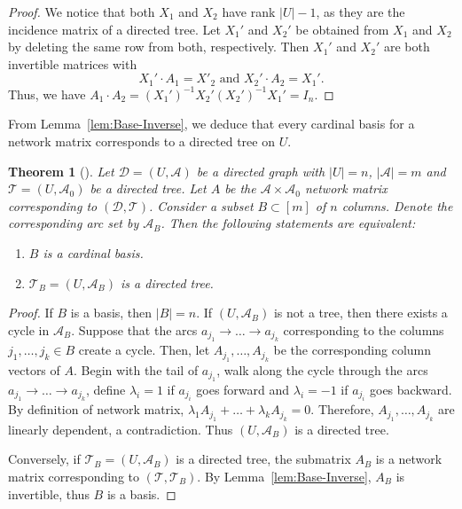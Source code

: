 \documentclass[11pt]{article}
\newtheorem{theorem}{Theorem}
\begin{document}
\begin{proof}
\smallskip

We notice that both $X_1$ and $X_2$ have rank $|U|-1$, as they are the incidence matrix of a directed tree. Let $X_1'$ and $X_2'$ be obtained from $X_1$ and $X_2$ by deleting the same row from both, respectively. Then $X_1'$ and $X_2'$ are both invertible matrices with
$$X_1'\cdot A_1=X'_2\textrm{ and }X_2'\cdot A_2=X_1'.$$
Thus, we have $A_1\cdot A_2=(X_1')^{-1} X_2'(X_2')^{-1}X_1'=I_n$.
\end{proof}



From Lemma~\ref{lem:Base-Inverse}, we deduce that every cardinal basis for a network matrix corresponds to a directed tree on $U$.

\begin{theorem}[\cite{schrijver1998theory}]\label{lem:Base-SpanningTree}
Let $\mathcal{D}=(U,\mathcal{A})$ be a directed graph with $|U|=n$, $|\mathcal{A}|=m$ and $\mathcal{T}=(U,\mathcal{A}_0)$ be a directed tree. Let $A$ be the $\mathcal{A}\times \mathcal{A}_0$ network matrix corresponding to $(\mathcal{D},\mathcal{T})$. Consider a subset $B\subset [m]$ of $n$ columns. Denote the corresponding arc set by $\mathcal{A}_B$. Then the following statements are equivalent:
    \begin{enumerate}
        \item[(i)] $B$ is a cardinal basis. \item[(ii)] $\mathcal{T}_B=(U,\mathcal{A}_B)$ is a directed tree.
    \end{enumerate}
\end{theorem}

\begin{proof}
    If $B$ is a basis, then $|B|=n$. If $(U,\mathcal{A}_B)$ is not a tree, then there exists a cycle in $\mathcal{A}_B$. Suppose that the arcs $a_{j_1}\to\dots\to a_{j_k}$ corresponding to the columns $j_1,\dots,j_k\in B$ create a cycle. Then, let $A_{j_1},\dots,A_{j_k}$ be the corresponding column vectors of $A$. Begin with the tail of $a_{j_1}$, walk along the cycle through the arcs $a_{j_1}\to\dots\to a_{j_k}$, define $\lambda_i=1$ if $a_{j_i}$ goes forward and $\lambda_i=-1$ if $a_{j_i}$ goes backward. By definition of network matrix, $\lambda_1 A_{j_1}+\dots+\lambda_k A_{j_k}=0$. Therefore, $A_{j_1},\dots,A_{j_k}$ are linearly dependent, a contradiction. Thus $(U,\mathcal{A}_B)$ is a directed tree.

    Conversely, if $\mathcal{T}_B=(U,\mathcal{A}_B)$ is a directed tree, the submatrix $A_B$ is a network matrix corresponding to $(\mathcal{T},\mathcal{T}_B)$. By Lemma~\ref{lem:Base-Inverse}, $A_B$ is invertible, thus $B$ is a basis.
\end{proof}
\end{document}
